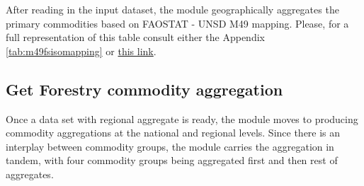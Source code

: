 \documentclass[
]{book}
\begin{document}
After reading in the input dataset, the module geographically aggregates the primary commodities based on FAOSTAT - UNSD M49 mapping. Please, for a full representation of this table consult either the Appendix \ref{tab:m49fsisomapping} or \href{http://www.fao.org/faostat/en/\#data/FO}{this link}.

\hypertarget{get-forestry-commodity-aggregation}{%
\subsection{\texorpdfstring{\textbf{Get Forestry commodity aggregation}}{Get Forestry commodity aggregation}}\label{get-forestry-commodity-aggregation}}

Once a data set with regional aggregate is ready, the module moves to producing commodity aggregations at the national and regional levels.
Since there is an interplay between commodity groups, the module carries the aggregation in tandem, with four commodity groups being aggregated first and then rest of aggregates.
\end{document}
